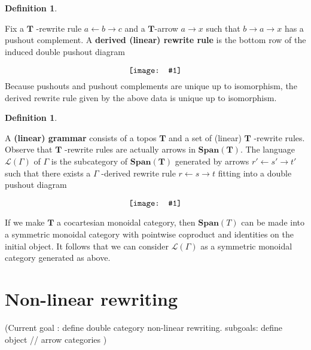 \documentclass{amsart}
\newcommand{\defn}[1]{\textbf{#1}}
\newcommand{\cat}[1]{\mathbf{#1}}
\newcommand{\diagram}[1]{\raisebox{-0.5\height}{\texttt{[image: \#1]}}}
\newcommand{\Span}{\mathbf{Span}}
\newcommand{\edit}[1]{\textcolor{editcolour}{(#1)}}
\theoremstyle{remark}
\theoremstyle{definition}
\newtheorem{definition}[theorem]{Definition}
\begin{document}
\begin{definition}
\label{df:dpo_derived-rewrite-rule} 
	
  Fix a \( \cat{T} \) -rewrite rule \( a \gets b \to c \) and a
  $ \cat{T} $-arrow $ a \to x $ such that $ b \to a \to x $ has a 
  pushout complement. A \defn{derived (linear) rewrite rule} is the
  bottom row of the induced double pushout diagram 
  \[ 
    \diagram{diag_rw_derived-rule}
  \]
  Because pushouts and pushout complements are unique up to
  isomorphism, the derived rewrite rule given by the above data is
  unique up to isomorphism.
 
\end{definition}

\begin{definition}
  \label{df:dpo_grammar-and-language}

  A \defn{(linear) grammar} consists of a topos \( \cat{T} \) and a
  set of (linear) \( \cat{T} \) -rewrite rules.  Observe that
  \( \cat{T} \) -rewrite rules are actually arrows in
  $ \Span (\cat{T}) $. The language $ \mathcal{L} ( \Gamma ) $ of
  $ \Gamma $ is the subcategory of $ \Span ( \cat{T} ) $ generated by
  arrows \( r' \gets s' \to t' \) such that there exists a
  \( \Gamma \) -derived rewrite rule \( r \gets s \to t \) fitting
  into a double pushout diagram
  \[
    \diagram{diag_rw_language-generators}
  \]

  If we make \( \cat{T} \) a cocartesian monoidal category, then
  \( \Span (T) \) can be made into a symmetric monoidal category with
  pointwise coproduct and identities on the initial object. It follows
  that we can consider \( \mathcal{L} ( \Gamma ) \) as a symmetric
  monoidal category generated as above.
  
\end{definition}


\section{Non-linear rewriting} \label{sec:non-linear-rewriting}



\edit{Current goal : define double category non-linear
  rewriting. subgoals: define object // arrow categories }
\end{document}
